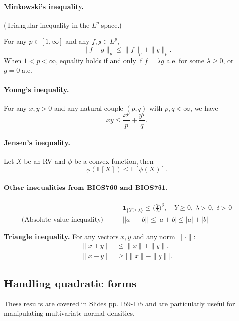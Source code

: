 \documentclass{article}
\theoremstyle{break}
\newcommand{\E}{\ensuremath{\mathbb{E}}}
\begin{document}
\paragraph{Minkowski's inequality.} (Triangular inequality in the $L^p$ space.) 

For any $p \in [1,\infty]$ and any $f, g \in L^p$,
\[
\| f + g \|_p \leq \| f \|_p + \| g \|_p.
\]
When $1<p<\infty$, equality holds if and only if $f=\lambda g$ a.e. for some $\lambda \geq 0$, or $g=0$ a.e.

\paragraph{Young's inequality.} 
For any $x,y>0$ and any natural couple $(p,q)$ with $p,q<\infty$, we have
\[
xy \leq \frac{x^p}{p} + \frac{y^q}{q}.
\]

\paragraph{Jensen's inequality.}
Let $X$ be an RV and $\phi$ be a convex function, then 
\[
\phi(\E[X]) \leq \E[\phi(X)].
\]


\paragraph{Other inequalities from BIOS760 and BIOS761.}
\begin{align*}
    & \mathbf{1}_{\{Y \geq \lambda\}} \leq \Big(\frac{Y}{\lambda}\Big)^\delta, \quad Y \geq 0,\ \lambda > 0, \ \delta > 0\\
    \text{(Absolute value inequality)}\qquad
    & \big| |a| - |b| \big| \leq |a \pm b| \leq |a| + |b|
\end{align*}


\textbf{Triangle inequality.}
For any vectors $x,y$ and any norm $\|\cdot\|$:
\begin{align*}
\|x+y\| &\le \|x\|+\|y\|,\\
\|x-y\| &\ge \bigl|\|x\|-\|y\|\bigr|.    
\end{align*}



\subsection{Handling quadratic forms}\label{sec:misc-handle-quad-forms}
These results are covered in Slides pp. 159-175 and are particularly useful for manipulating multivariate normal densities.
\end{document}

